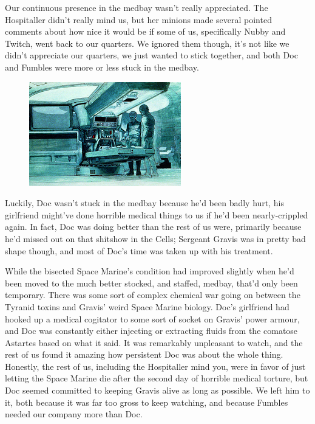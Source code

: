 Our continuous presence in the medbay wasn't really appreciated. 
The Hospitaller didn't really mind us, but her minions made several pointed comments about how nice it would be if some of us, specifically Nubby and Twitch, went back to our quarters. 
We ignored them though, it's not like we didn't appreciate our quarters, we just wanted to stick together, and both Doc and Fumbles were more or less stuck in the medbay.
\begin{figure}
	\begin{center}
		\includegraphics[width=\figwidth]{pics/12/77.png}
	\end{center}
\end{figure}
Luckily, Doc wasn't stuck in the medbay because he'd been badly hurt, his girlfriend might've done horrible medical things to us if he'd been nearly-crippled again. 
In fact, Doc was doing better than the rest of us were, primarily because he'd missed out on that shitshow in the Cells; 
Sergeant Gravis was in pretty bad shape though, and most of Doc's time was taken up with his treatment.

While the bisected Space Marine's condition had improved slightly when he'd been moved to the much better stocked, and staffed, medbay, that'd only been temporary. 
There was some sort of complex chemical war going on between the Tyranid toxins and Gravis' weird Space Marine biology. 
Doc's girlfriend had hooked up a medical cogitator to some sort of socket on Gravis' power armour, and Doc was constantly either injecting or extracting fluids from the comatose Astartes based on what it said. 
It was remarkably unpleasant to watch, and the rest of us found it amazing how persistent Doc was about the whole thing. 
Honestly, the rest of us, including the Hospitaller mind you, were in favor of just letting the Space Marine die after the second day of horrible medical torture, but Doc seemed committed to keeping Gravis alive as long as possible. 
We left him to it, both because it was far too gross to keep watching, and because Fumbles needed our company more than Doc.

